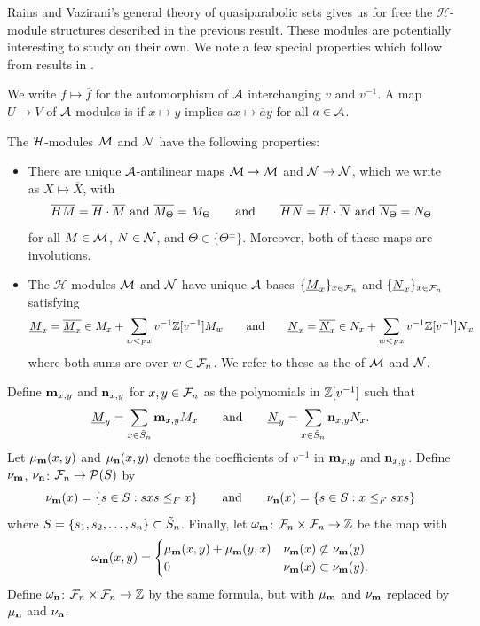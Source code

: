 \documentclass[11pt]{article}
\begin{document}
Rains and Vazirani's general theory of quasiparabolic sets gives us for free the $\mathcal{H}$-module structures described in the previous result. These modules are potentially interesting to study on their own. We note a few special properties which follow from results in \cite{Marberg}.

We write $f \mapsto \overline{f}$ for the automorphism of $\mathcal{A}$ interchanging $v$ and $v^{-1}$. A map $U\to V$ of $\mathcal{A}$-modules is  if $x\mapsto y$ implies $ax\mapsto\overline{a}y$ for all $a\in\mathcal{A}$.


\begin{corollary}
The $\mathcal H$-modules $\mathcal{M}$ and $\mathcal{N}$ have the following properties:
\begin{itemize}
\item[(a)] There are unique $\mathcal{A}$-antilinear maps $\mathcal{M}\to\mathcal{M}$ and $\mathcal{N}\to\mathcal{N}$, which we write as $X \mapsto\overline X$,
with 
$$\overline{HM}=\overline{H}\cdot\overline{M}\text{ and }\overline{M_{\Theta}}=M_{\Theta}
\qquad\text{and}\qquad
\overline{HN}=\overline{H}\cdot\overline{N}\text{ and }\overline{N_{\Theta}}=N_{\Theta}
$$
for all $M \in \mathcal{M}$, $N \in \mathcal{N}$, and $\Theta \in \{\Theta^\pm\}$. Moreover, both of these maps are involutions.

\item[(b)] The $\mathcal{H}$-modules
$\mathcal{M}$ and $\mathcal{N}$ have unique $\mathcal{A}$-bases $\{\underline{M}_x\}_{x \in \mathcal F_n}$ and $\{\underline{N}_x\}_{x \in \mathcal F_n}$ satisfying
$$\underline{M}_x=\overline{\underline{M}_x}\in M_x+\sum_{w<_F x}v^{-1}\mathbb{Z}[v^{-1}]M_w
\qquad\text{and}\qquad
\underline{N}_x=\overline{\underline{N}_x}\in N_x+\sum_{w<_F x}v^{-1}\mathbb{Z}[v^{-1}]N_w$$
where both sums are over $w\in\mathcal F_n$. We refer to these as  the  of $\mathcal{M}$ and $\mathcal{N}$.

\end{itemize}
\end{corollary}

Define $\mathbf{m}_{x,y}$ and $\mathbf{n}_{x,y}$ for $x,y\in \mathcal F_n$ as the polynomials in $\mathbb{Z}[v^{-1}]$ such that
$$\underline{M}_y=\sum_{x\in  \tilde S_n}\mathbf{m}_{x,y}M_x\qquad\text{and}\qquad \underline{N}_y=\sum_{x\in \tilde S_n}\mathbf{n}_{x,y}N_x.$$
Let $\mu_{\mathbf{m}}(x,y)$ and $\mu_{\mathbf{n}}(x,y)$ denote the coefficients of $v^{-1}$ in $\mathbf{m}_{x,y}$ and $\mathbf{n}_{x,y}$.
Define $\nu_{\mathbf{m}}$, $\nu_{\mathbf{n}}$: $\mathcal F_n\to \mathcal{P}(S)$ by
\[
\nu_{\mathbf{m}}(x) = \{s\in S : sxs \le_F x\}\qquad\text{and}\qquad \nu_{\mathbf{n}}(x) = \{s\in S : x\le_F sxs\}
\]
where $S = \{s_1,s_2,\dots,s_n \} \subset \tilde S_n$.
Finally, let $\omega_{\mathbf{m}}$: $\mathcal F_n\times\mathcal F_n\to\mathbb{Z}$ be the map with
\[
\omega_{\mathbf{m}}(x,y)=\begin{cases}\mu_{\mathbf{m}}(x,y)+\mu_{\mathbf{m}}(y,x)&\nu_{\mathbf{m}}(x)\not\subset\nu_{\mathbf{m}}(y)\\
0&\nu_{\mathbf{m}}(x)\subset\nu_{\mathbf{m}}(y).\end{cases}
\]
Define $\omega_{\mathbf{n}}$: $\mathcal F_n\times\mathcal F_n\to\mathbb{Z}$ by the same formula, but with $\mu_{\mathbf{m}}$ and $\nu_{\mathbf{m}}$ replaced by $\mu_{\mathbf{n}}$ and $\nu_{\mathbf{n}}$.
\end{document}
